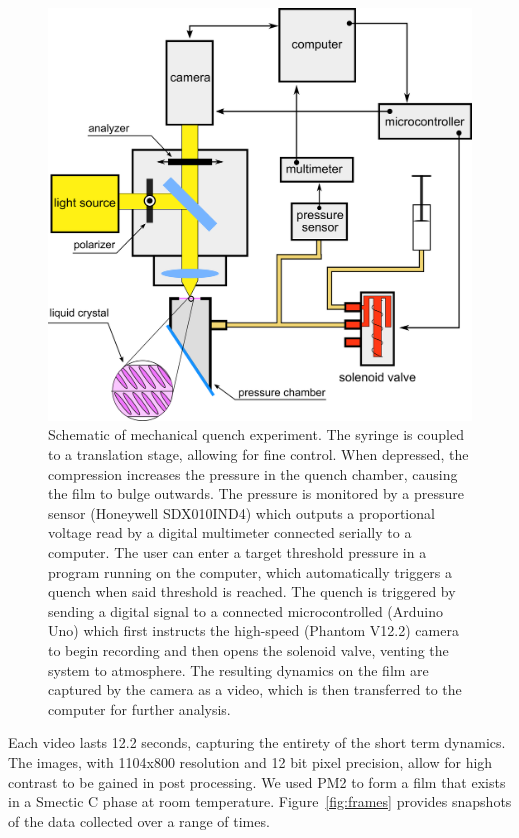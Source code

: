 \documentclass[twoside,twocolumn,9pt]{article}
\begin{document}
\begin{figure}
  \includegraphics[width=\linewidth]{quench-schematic.png}
  \caption{Schematic of mechanical quench experiment. The syringe is coupled to a translation stage, allowing for fine control.
When depressed, the compression increases the pressure in the quench chamber,
causing the film to bulge outwards. The pressure is monitored by a pressure
sensor (Honeywell SDX010IND4) which outputs a proportional voltage read by a
digital multimeter connected serially to a computer. The user can enter a
target threshold pressure in a program running on the computer, which
automatically triggers a quench when said threshold is reached. The quench is
triggered by sending a digital signal to a connected microcontrolled (Arduino
Uno) which first instructs the high-speed (Phantom V12.2) camera to begin
recording and then opens the solenoid valve, venting the system to atmosphere.
The resulting dynamics on the film are captured by the camera as a video, which
is then transferred to the computer for further analysis.}
  \label{fig:Setup Sketch}
\end{figure}

Each video lasts 12.2 seconds, capturing the entirety of the short term dynamics. The images, with 1104x800 resolution and 12 bit pixel precision, allow for high contrast to be gained in post processing.
We used PM2 \cite{harth_episodes_2016} to form a film that exists in a Smectic C phase at room temperature. Figure~\ref{fig:frames} provides snapshots of the data collected over a range of times.
\end{document}
